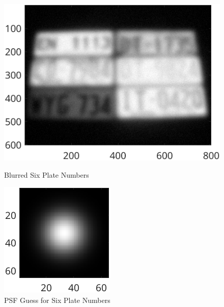 \documentclass{article}
\begin{document}
  	
	\begin{figure}[ht]
  	\centering
  	\begin{minipage}[t]{0.45\textwidth}
    	\centering
    	\includegraphics[width=\textwidth]{2AE3_Blurred}
    	\caption{Blurred Six Plate Numbers}
    	\label{fig:2AE3_Blurred}
  	\end{minipage}\hfill
  	\begin{minipage}[t]{0.45\textwidth}
    	\centering
    	\includegraphics[width=\textwidth]{2AE3_PSF}
    	\caption{PSF Guess for Six Plate Numbers}
    	\label{fig:2AE3_PSF}
  	\end{minipage}
	\end{figure}
\end{document}
